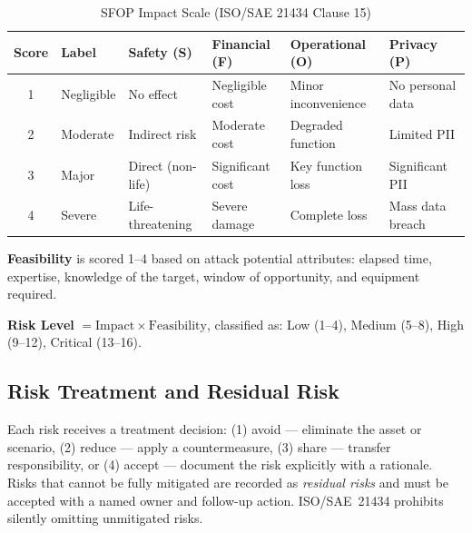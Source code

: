 \begin{table}[h]
\centering
\caption{SFOP Impact Scale (ISO/SAE 21434 Clause 15)}
\label{tab:sfop}
\small
\begin{tabular}{clllll}
\toprule
\textbf{Score} & \textbf{Label} & \textbf{Safety (S)} & \textbf{Financial (F)}
               & \textbf{Operational (O)} & \textbf{Privacy (P)} \\
\midrule
1 & Negligible & No effect & Negligible cost & Minor inconvenience & No personal data \\
2 & Moderate   & Indirect risk & Moderate cost & Degraded function & Limited PII \\
3 & Major      & Direct (non-life) & Significant cost & Key function loss & Significant PII \\
4 & Severe     & Life-threatening & Severe damage & Complete loss & Mass data breach \\
\bottomrule
\end{tabular}
\end{table}

\textbf{Feasibility} is scored 1--4 based on attack potential attributes: elapsed time, expertise, knowledge of the target, window of opportunity, and equipment required.

\textbf{Risk Level} $= \text{Impact} \times \text{Feasibility}$, classified as: Low (1--4), Medium (5--8), High (9--12), Critical (13--16).

\subsection{Risk Treatment and Residual Risk}

Each risk receives a treatment decision: (1) avoid --- eliminate the asset or scenario, (2) reduce --- apply a countermeasure, (3) share --- transfer responsibility, or (4) accept --- document the risk explicitly with a rationale. Risks that cannot be fully mitigated are recorded as \emph{residual risks} and must be accepted with a named owner and follow-up action. ISO/SAE~21434 prohibits silently omitting unmitigated risks.
